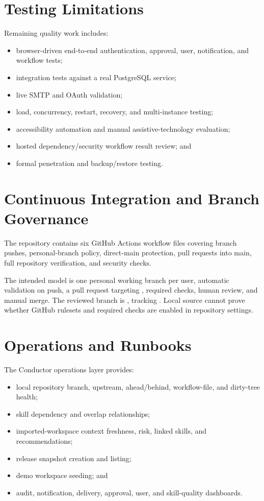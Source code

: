 \documentclass[12pt]{report}
\begin{document}
\section{Testing Limitations}

Remaining quality work includes:

\begin{itemize}
  \item browser-driven end-to-end authentication, approval, user, notification, and workflow tests;
  \item integration tests against a real PostgreSQL service;
  \item live SMTP and OAuth validation;
  \item load, concurrency, restart, recovery, and multi-instance testing;
  \item accessibility automation and manual assistive-technology evaluation;
  \item hosted dependency/security workflow result review; and
  \item formal penetration and backup/restore testing.
\end{itemize}

\section{Continuous Integration and Branch Governance}

The repository contains six GitHub Actions workflow files covering branch pushes, personal-branch policy, direct-main protection, pull requests into main, full repository verification, and security checks.

The intended model is one personal working branch per user, automatic validation on push, a pull request targeting , required checks, human review, and manual merge. The reviewed branch is , tracking . Local source cannot prove whether GitHub rulesets and required checks are enabled in repository settings.

\section{Operations and Runbooks}

The Conductor operations layer provides:

\begin{itemize}
  \item local repository branch, upstream, ahead/behind, workflow-file, and dirty-tree health;
  \item skill dependency and overlap relationships;
  \item imported-workspace context freshness, risk, linked skills, and recommendations;
  \item release snapshot creation and listing;
  \item demo workspace seeding; and
  \item audit, notification, delivery, approval, user, and skill-quality dashboards.
\end{itemize}
\end{document}
